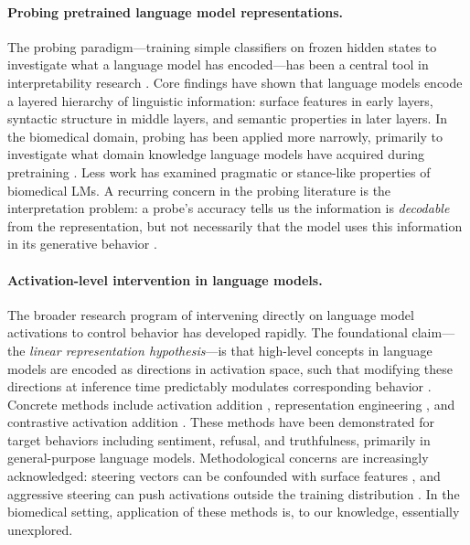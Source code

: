\documentclass[11pt,a4paper]{article}
\begin{document}
\paragraph{Probing pretrained language model representations.}
The probing paradigm---training simple classifiers on frozen hidden
states to investigate what a language model has encoded---has been a
central tool in interpretability research \citep{hewitt2019structural,
tenney2019bert, belinkov2022probing}. Core findings have shown that
language models encode a layered hierarchy of linguistic information:
surface features in early layers, syntactic structure in middle layers,
and semantic properties in later layers. In the biomedical domain,
probing has been applied more narrowly, primarily to investigate what
domain knowledge language models have acquired during pretraining
\citep{sung2021biomedical, vulic2020probing}. Less work has examined
pragmatic or stance-like properties of biomedical LMs. A recurring
concern in the probing literature is the interpretation problem: a
probe's accuracy tells us the information is \emph{decodable} from the
representation, but not necessarily that the model uses this information
in its generative behavior \citep{ravichander2021probing}.

\paragraph{Activation-level intervention in language models.}
The broader research program of intervening directly on language model
activations to control behavior has developed rapidly. The foundational
claim---the \emph{linear representation hypothesis}---is that high-level
concepts in language models are encoded as directions in activation
space, such that modifying these directions at inference time
predictably modulates corresponding behavior \citep{park2023linear}.
Concrete methods include activation addition \citep{turner2023activation},
representation engineering \citep{zou2023representation}, and contrastive
activation addition \citep{panickssery2024steering}. These methods have
been demonstrated for target behaviors including sentiment, refusal, and
truthfulness, primarily in general-purpose language models.
Methodological concerns are increasingly acknowledged: steering vectors
can be confounded with surface features \citep{elazar2021amnesic}, and
aggressive steering can push activations outside the training
distribution \citep{zou2023representation}. In the biomedical setting,
application of these methods is, to our knowledge, essentially
unexplored.
\end{document}
